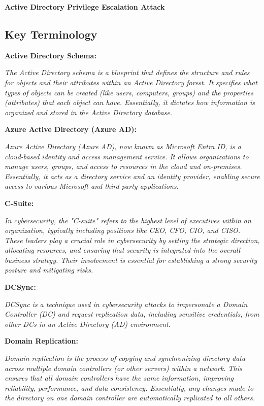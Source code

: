 
\textbf{Active Directory Privilege Escalation Attack }

\subsection{\textbf{Key Terminology}}

\textbf{Active Directory Schema:}

\textit{The Active Directory schema is a blueprint that defines the structure and rules for objects and their attributes within an Active Directory forest. It specifies what types of objects can be created (like users, computers, groups) and the properties (attributes) that each object can have. Essentially, it dictates how information is organized and stored in the Active Directory database.}

\textbf{Azure Active Directory (Azure AD):}

\textit{Azure Active Directory (Azure AD), now known as Microsoft Entra ID, is a cloud-based identity and access management service. It allows organizations to manage users, groups, and access to resources in the cloud and on-premises. Essentially, it acts as a directory service and an identity provider, enabling secure access to various Microsoft and third-party applications.}

\textbf{C-Suite:}

\textit{In cybersecurity, the "C-suite" refers to the highest level of executives within an organization, typically including positions like CEO, CFO, CIO, and CISO. These leaders play a crucial role in cybersecurity by setting the strategic direction, allocating resources, and ensuring that security is integrated into the overall business strategy. Their involvement is essential for establishing a strong security posture and mitigating risks.}

\textbf{DCSync:}

\textit{DCSync is a technique used in cybersecurity attacks to impersonate a Domain Controller (DC) and request replication data, including sensitive credentials, from other DCs in an Active Directory (AD) environment.}

\textbf{Domain Replication:}

\textit{Domain replication is the process of copying and synchronizing directory data across multiple domain controllers (or other servers) within a network. This ensures that all domain controllers have the same information, improving reliability, performance, and data consistency. Essentially, any changes made to the directory on one domain controller are automatically replicated to all others.}


